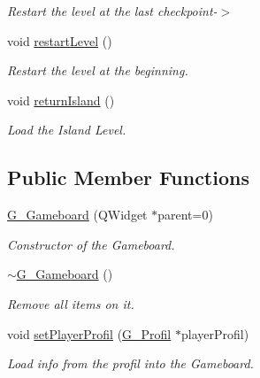 \begin{DoxyCompactItemize}
\begin{DoxyCompactList}\small\item\em Restart the level at the last checkpoint-\/$>$ \end{DoxyCompactList}\item 
\hypertarget{class_g___gameboard_aa7e2e09932f2f0859009abaa99c53ada}{}void \hyperlink{class_g___gameboard_aa7e2e09932f2f0859009abaa99c53ada}{restart\+Level} ()\label{class_g___gameboard_aa7e2e09932f2f0859009abaa99c53ada}

\begin{DoxyCompactList}\small\item\em Restart the level at the beginning. \end{DoxyCompactList}\item 
\hypertarget{class_g___gameboard_a536b6194e02960ac47ad54d5e8647afc}{}void \hyperlink{class_g___gameboard_a536b6194e02960ac47ad54d5e8647afc}{return\+Island} ()\label{class_g___gameboard_a536b6194e02960ac47ad54d5e8647afc}

\begin{DoxyCompactList}\small\item\em Load the Island Level. \end{DoxyCompactList}\end{DoxyCompactItemize}
\subsection*{Public Member Functions}
\begin{DoxyCompactItemize}
\item 
\hyperlink{class_g___gameboard_ae6ae7653d9dfe58687423ea159198b03}{G\+\_\+\+Gameboard} (Q\+Widget $\ast$parent=0)
\begin{DoxyCompactList}\small\item\em Constructor of the Gameboard. \end{DoxyCompactList}\item 
\hypertarget{class_g___gameboard_ac0188a03ee6d69b116b9e225faa264f0}{}\hyperlink{class_g___gameboard_ac0188a03ee6d69b116b9e225faa264f0}{$\sim$\+G\+\_\+\+Gameboard} ()\label{class_g___gameboard_ac0188a03ee6d69b116b9e225faa264f0}

\begin{DoxyCompactList}\small\item\em Remove all items on it. \end{DoxyCompactList}\item 
void \hyperlink{class_g___gameboard_a3742b642a0654410d81415107b70629c}{set\+Player\+Profil} (\hyperlink{class_g___profil}{G\+\_\+\+Profil} $\ast$player\+Profil)
\begin{DoxyCompactList}\small\item\em Load info from the profil into the Gameboard. \end{DoxyCompactList}\end{DoxyCompactItemize}

